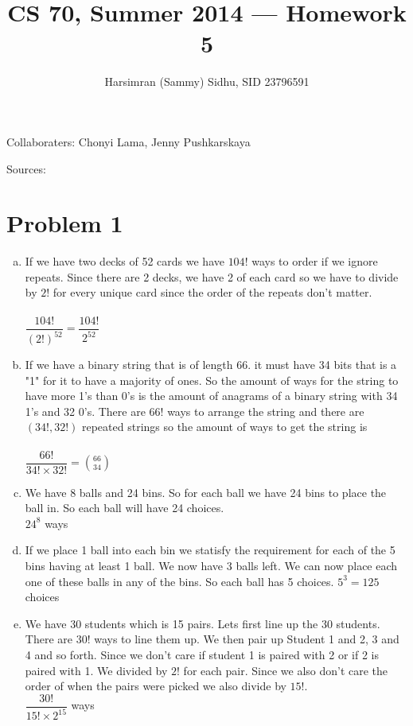 \documentclass[11pt,letterpaper]{article}
\title{CS 70, Summer 2014 --- Homework 5} %
\author{Harsimran (Sammy) Sidhu, SID 23796591} %
\begin{document}
\maketitle

Collaboraters: Chonyi Lama, Jenny Pushkarskaya

Sources: 

\section*{Problem 1} %

\begin{enumerate}[(a)]
\item
If we have two decks of 52 cards we have $104!$ ways to order if we ignore repeats. Since there are 2 decks, we have 2 of each card so we have to divide by $2!$ for every unique card since the order of the repeats don't matter.\\\\
$\dfrac{104!}{(2!)^{52}} = \dfrac{104!}{2^{52}}$\\
\item
If we have a binary string that is of length 66. it must have 34 bits that is a "1" for it to have a majority of ones. So the amount of ways for the string to have more 1's than 0's is the amount of anagrams of a binary string with 34 1's and 32 0's. There are $66!$ ways to arrange the string and there are $(34!,32!)$ repeated strings so the amount of ways to get the string is\\\\
$\dfrac{66!}{34!\times32!} = {66 \choose 34}$\\
\item
We have 8 balls and 24 bins. So for each ball we have 24 bins to place the ball in. So each ball will have 24 choices.\\
$24^8$ ways
\item
If we place 1 ball into each bin we statisfy the requirement for each of the 5 bins having at least 1 ball. We now have 3 balls left. We can now place each one of these balls in any of the bins. So each ball has 5 choices.
$5^3=125$ choices 
\item
We have 30 students which is 15 pairs. Lets first line up the 30 students. There are $30!$ ways to line them up. We then pair up Student 1 and 2, 3 and 4 and so forth. Since we don't care if student 1 is paired with 2 or if 2 is paired with 1. We divided by $2!$ for each pair. Since we also don't care the order of when the pairs were picked we also divide by $15!$.\\
$\dfrac{30!}{15!\times 2^{15}}$ ways
\end{enumerate}
\clearpage
\end{document}
